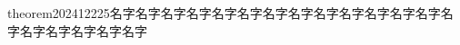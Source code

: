 \documentclass{daily}
\begin{document}
\begin{daily}{theorem}{20241222}{5}{名字名字名字名字名字名字名字名字名字名字名字名字名字名字名字名字名字名字名字}
	
\end{daily}
\end{document}
